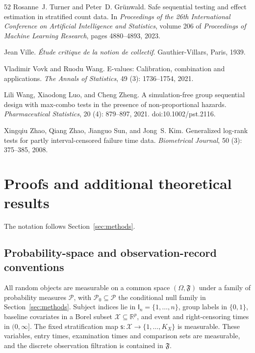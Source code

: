 \documentclass[12pt]{article}
\theoremstyle{definition}
\theoremstyle{remark}
\begin{document}
\begin{thebibliography}{52}
Rosanne~J. Turner and Peter~D. Gr\"unwald.
\newblock Safe sequential testing and effect estimation in stratified count
  data.
\newblock In \emph{Proceedings of the 26th International Conference on
  Artificial Intelligence and Statistics}, volume 206 of \emph{Proceedings of
  Machine Learning Research}, pages 4880--4893, 2023.

Jean Ville.
\newblock \emph{\'Etude critique de la notion de collectif}.
\newblock Gauthier-Villars, Paris, 1939.

Vladimir Vovk and Ruodu Wang.
\newblock E-values: Calibration, combination and applications.
\newblock \emph{The Annals of Statistics}, 49 (3):
  1736--1754, 2021.

Lili Wang, Xiaodong Luo, and Cheng Zheng.
\newblock A simulation-free group sequential design with max-combo tests in the presence of non-proportional hazards.
\newblock \emph{Pharmaceutical Statistics}, 20 (4): 879--897, 2021.
\newblock doi:10.1002/pst.2116.

Xingqiu Zhao, Qiang Zhao, Jianguo Sun, and Jong~S. Kim.
\newblock Generalized log-rank tests for partly interval-censored failure time
  data.
\newblock \emph{Biometrical Journal}, 50 (3): 375--385, 2008.

\end{thebibliography}

\appendix
{}

\section{Proofs and additional theoretical results}
\label{app:proofs}

The notation follows Section~\ref{sec:methods}.

\subsection{Probability-space and observation-record conventions}
\label{app:formal-setup}

All random objects are measurable on a common space $(\Omega,\mathfrak F)$ under a family of probability measures $\mathcal P$, with $\mathcal P_0\subseteq\mathcal P$ the conditional null family in Section~\ref{sec:methods}. Subject indices lie in $\mathsf I_n=\{1,\ldots,n\}$, group labels in $\{0,1\}$, baseline covariates in a Borel subset $\mathcal X\subseteq\mathbb R^p$, and event and right-censoring times in $(0,\infty]$. The fixed stratification map $\mathsf s:\mathcal X\to\{1,\ldots,K_X\}$ is measurable. These variables, entry times, examination times and comparison sets are measurable, and the discrete observation filtration is contained in $\mathfrak F$.
\end{document}
